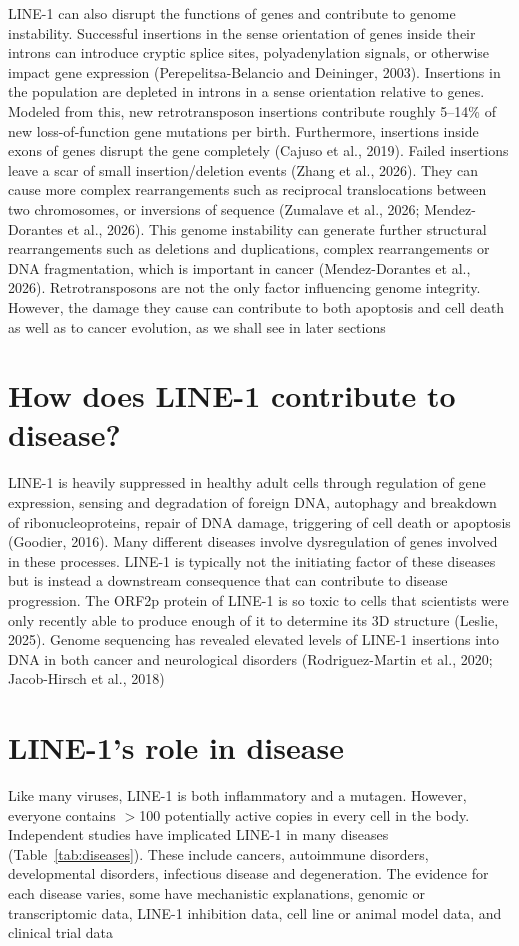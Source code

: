 \documentclass[11pt,twocolumn,twoside]{extarticle}
\begin{document}
LINE-1 can also disrupt the functions of genes and contribute to genome instability. Successful insertions in the sense orientation of genes inside their introns can introduce cryptic splice sites, polyadenylation signals, or otherwise impact gene expression (Perepelitsa-Belancio and Deininger, 2003). Insertions in the population are depleted in introns in a sense orientation relative to genes. Modeled from this, new retrotransposon insertions contribute roughly 5--14\% of new loss-of-function gene mutations per birth. Furthermore, insertions inside exons of genes disrupt the gene completely (Cajuso et al., 2019). Failed insertions leave a scar of small insertion/deletion events (Zhang et al., 2026). They can cause more complex rearrangements such as reciprocal translocations between two chromosomes, or inversions of sequence (Zumalave et al., 2026; Mendez-Dorantes et al., 2026). This genome instability can generate further structural rearrangements such as deletions and duplications, complex rearrangements or DNA fragmentation, which is important in cancer (Mendez-Dorantes et al., 2026). Retrotransposons are not the only factor influencing genome integrity. However, the damage they cause can contribute to both apoptosis and cell death as well as to cancer evolution, as we shall see in later sections

\section{How does LINE-1 contribute to disease?}
LINE-1 is heavily suppressed in healthy adult cells through regulation of gene expression, sensing and degradation of foreign DNA, autophagy and breakdown of ribonucleoproteins, repair of DNA damage, triggering of cell death or apoptosis (Goodier, 2016). Many different diseases involve dysregulation of genes involved in these processes. LINE-1 is typically not the initiating factor of these diseases but is instead a downstream consequence that can contribute to disease progression. The ORF2p protein of LINE-1 is so toxic to cells that scientists were only recently able to produce enough of it to determine its 3D structure (Leslie, 2025). Genome sequencing has revealed elevated levels of LINE-1 insertions into DNA in both cancer and neurological disorders (Rodriguez-Martin et al., 2020; Jacob-Hirsch et al., 2018)

\section{LINE-1's role in disease}
Like many viruses, LINE-1 is both inflammatory and a mutagen. However, everyone contains $>$100 potentially active copies in every cell in the body. Independent studies have implicated LINE-1 in many diseases (Table~\ref{tab:diseases}). These include cancers, autoimmune disorders, developmental disorders, infectious disease and degeneration. The evidence for each disease varies, some have mechanistic explanations, genomic or transcriptomic data, LINE-1 inhibition data, cell line or animal model data, and clinical trial data
\end{document}
